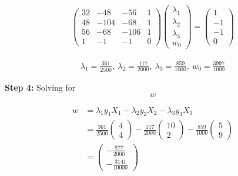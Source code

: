 \documentclass[12pt]{report}
\begin{document}
\begin{equation*}
	\begin{aligned}
		\begin{pmatrix}32 & -48 & -56 & 1 \\ 48&-104&-68&1\\ 56&-68&-106&1\\ 1&-1&-1&0\end{pmatrix}\begin{pmatrix}\lambda_{1}\\ \lambda_{2}\\ \lambda_{3}\\ w_{0}\end{pmatrix}=\begin{pmatrix}1\\ -1\\ -1\\ 0\end{pmatrix}
	\end{aligned}
\end{equation*}

\begin{equation*}
	\begin{aligned}
		\lambda_{1}=\frac{361}{2500},\:\lambda_{2}=\frac{117}{2000},\:\lambda_{3}=\frac{859}{1000},\:w_{0}=\frac{3997}{1000}
	\end{aligned}
\end{equation*}

\vspace{20pt}
\textbf{Step 4:} Solving for \begin{equation*}
	w
\end{equation*}

\begin{equation}
	\begin{aligned}
		w & = \lambda_{1}y_{1}X_{1} - \lambda_{2}y_{2}X_{2} - \lambda_{3}y_{3}X_{3}                                                                                                                        \\
		  & = \frac{361}{2500}\begin{pmatrix}4                                      \\ 4\end{pmatrix}-\frac{117}{2000}\begin{pmatrix}10\\ 2\end{pmatrix}-\frac{859}{1000}\begin{pmatrix}5\\ 9\end{pmatrix} \\
		  & = \begin{pmatrix}-\frac{877}{2000}                                      \\ -\frac{3141}{10000}\end{pmatrix}
	\end{aligned}
\end{equation}
\end{document}
